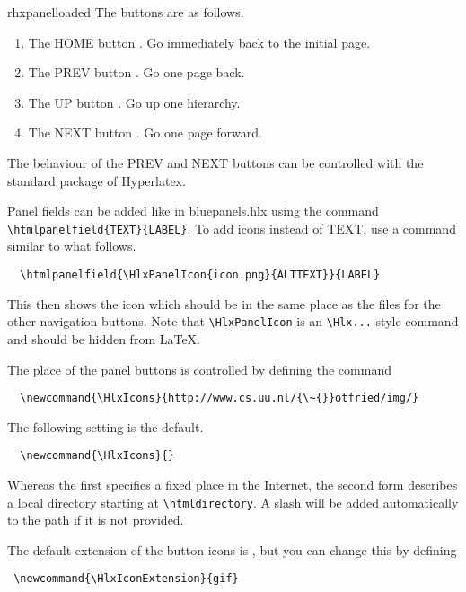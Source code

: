 \begin{ifset}{rhxpanelloaded}
The buttons are as follows.
\begin{enumerate}
\item The HOME button .
%
  Go immediately back to the initial page.
%
\item The PREV button .
%
  Go one page back.
%
\item The UP button .
%
  Go up one hierarchy.
%
\item The NEXT button .
%
  Go one page forward.
\end{enumerate}
\end{ifset}
The behaviour of the PREV and NEXT buttons can be controlled with the
standard  package of Hyperlatex.

Panel fields can be added like in bluepanels.hlx using the command
\verb'\htmlpanelfield{TEXT}{LABEL}'.
%
To add icons instead of TEXT, use a command similar to what follows.
\begin{verbatim}  
  \htmlpanelfield{\HlxPanelIcon{icon.png}{ALTTEXT}}{LABEL}
\end{verbatim}
This then shows the icon  which should be in the same
place as the files for the other navigation buttons.
%
Note that \verb'\HlxPanelIcon' is an \verb'\Hlx...' style command and
should be hidden from \LaTeX{}.













The place of the panel buttons is controlled by defining the
command
\begin{verbatim}
  \newcommand{\HlxIcons}{http://www.cs.uu.nl/{\~{}}otfried/img/}
\end{verbatim}
The following setting is the default.
\begin{verbatim}
  \newcommand{\HlxIcons}{}
\end{verbatim}
Whereas the first specifies a fixed place in the Internet, the second
form describes a local directory starting at \verb'\htmldirectory'. A
slash will be added automatically to the path if it is not provided.

The default extension of the button icons is , but you can
change this by defining
\begin{verbatim}
 \newcommand{\HlxIconExtension}{gif}
\end{verbatim}


